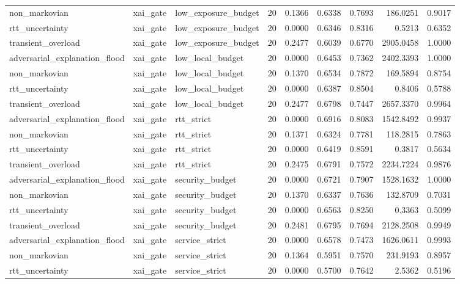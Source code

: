 \begin{table}[t]
\begin{tabular}{lllrrrrrr}
non\_markovian & xai\_gate & low\_exposure\_budget & 20 & 0.1366 & 0.6338 & 0.7693 & 186.0251 & 0.9017 \\
rtt\_uncertainty & xai\_gate & low\_exposure\_budget & 20 & 0.0000 & 0.6346 & 0.8316 & 0.5213 & 0.6352 \\
transient\_overload & xai\_gate & low\_exposure\_budget & 20 & 0.2477 & 0.6039 & 0.6770 & 2905.0458 & 1.0000 \\
adversarial\_explanation\_flood & xai\_gate & low\_local\_budget & 20 & 0.0000 & 0.6453 & 0.7362 & 2402.3393 & 1.0000 \\
non\_markovian & xai\_gate & low\_local\_budget & 20 & 0.1370 & 0.6534 & 0.7872 & 169.5894 & 0.8754 \\
rtt\_uncertainty & xai\_gate & low\_local\_budget & 20 & 0.0000 & 0.6387 & 0.8504 & 0.8406 & 0.5788 \\
transient\_overload & xai\_gate & low\_local\_budget & 20 & 0.2477 & 0.6798 & 0.7447 & 2657.3370 & 0.9964 \\
adversarial\_explanation\_flood & xai\_gate & rtt\_strict & 20 & 0.0000 & 0.6916 & 0.8083 & 1542.8492 & 0.9937 \\
non\_markovian & xai\_gate & rtt\_strict & 20 & 0.1371 & 0.6324 & 0.7781 & 118.2815 & 0.7863 \\
rtt\_uncertainty & xai\_gate & rtt\_strict & 20 & 0.0000 & 0.6419 & 0.8591 & 0.3817 & 0.5634 \\
transient\_overload & xai\_gate & rtt\_strict & 20 & 0.2475 & 0.6791 & 0.7572 & 2234.7224 & 0.9876 \\
adversarial\_explanation\_flood & xai\_gate & security\_budget & 20 & 0.0000 & 0.6721 & 0.7907 & 1528.1632 & 1.0000 \\
non\_markovian & xai\_gate & security\_budget & 20 & 0.1370 & 0.6337 & 0.7636 & 132.8709 & 0.7031 \\
rtt\_uncertainty & xai\_gate & security\_budget & 20 & 0.0000 & 0.6563 & 0.8250 & 0.3363 & 0.5099 \\
transient\_overload & xai\_gate & security\_budget & 20 & 0.2481 & 0.6795 & 0.7694 & 2128.2508 & 0.9949 \\
adversarial\_explanation\_flood & xai\_gate & service\_strict & 20 & 0.0000 & 0.6578 & 0.7473 & 1626.0611 & 0.9993 \\
non\_markovian & xai\_gate & service\_strict & 20 & 0.1364 & 0.5951 & 0.7570 & 231.9193 & 0.8957 \\
rtt\_uncertainty & xai\_gate & service\_strict & 20 & 0.0000 & 0.5700 & 0.7642 & 2.5362 & 0.5196 \\

\end{tabular}
\end{table}
